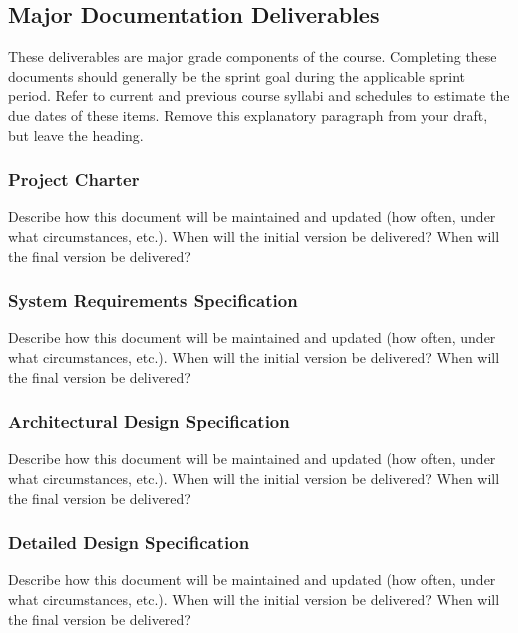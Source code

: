 
\subsection{Major Documentation Deliverables}
These deliverables are major grade components of the course. Completing these documents should generally be the sprint goal during the applicable sprint period. Refer to current and previous course syllabi and schedules to estimate the due dates of these items. Remove this explanatory paragraph from your draft, but leave the heading.

\subsubsection{Project Charter}
Describe how this document will be maintained and updated (how often, under what circumstances, etc.). When will the initial version be delivered? When will the final version be delivered?

\subsubsection{System Requirements Specification}
Describe how this document will be maintained and updated (how often, under what circumstances, etc.). When will the initial version be delivered? When will the final version be delivered?

\subsubsection{Architectural Design Specification}
Describe how this document will be maintained and updated (how often, under what circumstances, etc.). When will the initial version be delivered? When will the final version be delivered?

\subsubsection{Detailed Design Specification}
Describe how this document will be maintained and updated (how often, under what circumstances, etc.). When will the initial version be delivered? When will the final version be delivered?

